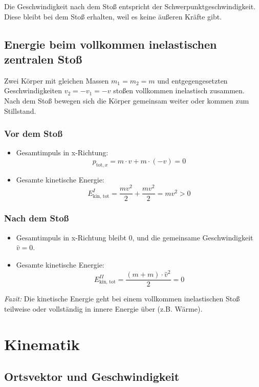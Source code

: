 \documentclass[a4paper, 8pt]{extarticle}
\begin{document}
\begin{landscape}
\begin{multicols*}{3}
Die Geschwindigkeit nach dem Stoß entspricht der Schwerpunktgeschwindigkeit. Diese bleibt bei dem Stoß erhalten, weil es keine äußeren Kräfte gibt.
\subsection{Energie beim vollkommen inelastischen zentralen Stoß}

Zwei Körper mit gleichen Massen \( m_1 = m_2 = m \) und entgegengesetzten Geschwindigkeiten \( v_2 = -v_1 = -v \) stoßen vollkommen inelastisch zusammen. Nach dem Stoß bewegen sich die Körper gemeinsam weiter oder kommen zum Stillstand.

\subsubsection{Vor dem Stoß}
\begin{itemize}
    \item Gesamtimpuls in x-Richtung: 
    \[
    p_{\text{tot}, x} = m \cdot v + m \cdot (-v) = 0
    \]
    \item Gesamte kinetische Energie: 
    \[
    E_{\text{kin, tot}}^I = \frac{m v^2}{2} + \frac{m v^2}{2} = m v^2 > 0
    \]
\end{itemize}

\subsubsection{Nach dem Stoß}
\begin{itemize}
    \item Gesamtimpuls in x-Richtung bleibt \( 0 \), und die gemeinsame Geschwindigkeit \( \hat{v} = 0 \).
    \item Gesamte kinetische Energie: 
    \[
    E_{\text{kin, tot}}^{II} = \frac{(m + m) \cdot \hat{v}^2}{2} = 0
    \]
\end{itemize}

\textit{Fazit:} Die kinetische Energie geht bei einem vollkommen inelastischen Stoß teilweise oder vollständig in innere Energie über (z.B. Wärme).

\section{Kinematik}

\subsection{Ortsvektor und Geschwindigkeit}


\end{multicols*}
\end{landscape}
\end{document}
